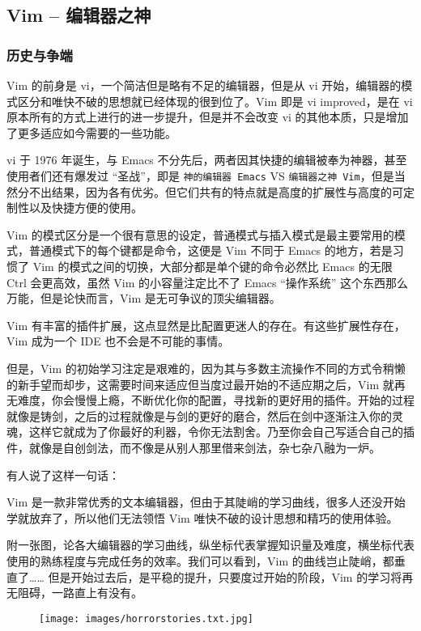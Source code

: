 
\subsection{Vim -- 编辑器之神}

\subsubsection{历史与争端}

Vim 的前身是 vi，一个简洁但是略有不足的编辑器，但是从 vi 开始，编辑器的模式区分和唯快不破的思想就已经体现的很到位了。Vim 即是 vi improved，是在 vi 原本所有的方式上进行的进一步提升，但是并不会改变 vi 的其他本质，只是增加了更多适应如今需要的一些功能。

vi 于 1976 年诞生，与 Emacs 不分先后，两者因其快捷的编辑被奉为神器，甚至使用者们还有爆发过 “圣战”，即是 \texttt{神的编辑器 Emacs} VS \texttt{编辑器之神 Vim}，但是当然分不出结果，因为各有优劣。但它们共有的特点就是高度的扩展性与高度的可定制性以及快捷方便的使用。

Vim 的模式区分是一个很有意思的设定，普通模式与插入模式是最主要常用的模式，普通模式下的每个键都是命令，这便是 Vim 不同于 Emacs 的地方，若是习惯了 Vim 的模式之间的切换，大部分都是单个键的命令必然比 Emacs 的无限 Ctrl 会更高效，虽然 Vim 的小容量注定比不了 Emacs “操作系统” 这个东西那么万能，但是论快而言，Vim 是无可争议的顶尖编辑器。

Vim 有丰富的插件扩展，这点显然是比配置更迷人的存在。有这些扩展性存在，Vim 成为一个 IDE 也不会是不可能的事情。

但是，Vim 的初始学习注定是艰难的，因为其与多数主流操作不同的方式令稍懒的新手望而却步，这需要时间来适应但当度过最开始的不适应期之后，Vim 就再无难度，你会慢慢上瘾，不断优化你的配置，寻找新的更好用的插件。开始的过程就像是铸剑，之后的过程就像是与剑的更好的磨合，然后在剑中逐渐注入你的灵魂，这样它就成为了你最好的利器，令你无法割舍。乃至你会自己写适合自己的插件，就像是自创剑法，而不像是从别人那里借来剑法，杂七杂八融为一炉。

有人说了这样一句话：

Vim 是一款非常优秀的文本编辑器，但由于其陡峭的学习曲线，很多人还没开始学就放弃了，所以他们无法领悟 Vim 唯快不破的设计思想和精巧的使用体验。

附一张图，论各大编辑器的学习曲线，纵坐标代表掌握知识量及难度，横坐标代表使用的熟练程度与完成任务的效率。我们可以看到，Vim 的曲线岂止陡峭，都垂直了…… 但是开始过去后，是平稳的提升，只要度过开始的阶段，Vim 的学习将再无阻碍，一路直上有没有。

\begin{figure}[h]
\centering
\texttt{[image: images/horrorstories.txt.jpg]} 

\end{figure}


